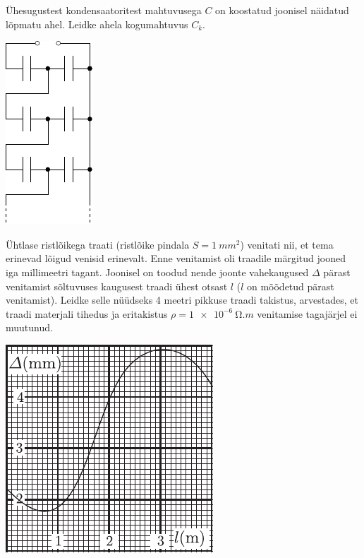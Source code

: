 \documentclass[10pt]{article}
\begin{document}
{%

Ühesugustest kondensaatoritest mahtuvusega $C$ on koostatud joonisel näidatud lõpmatu ahel. Leidke ahela kogumahtuvus $C_k$.

\begin{center}
	\includegraphics[width=0.3\linewidth]{2007-v2g-08-yl}
\end{center}
\probend
\bigskip


Ühtlase ristlõikega traati (ristlõike pindala $S = \SI{1}{mm^2}$) venitati nii, et tema erinevad lõigud venisid erinevalt. Enne venitamist oli traadile märgitud jooned iga millimeetri tagant. Joonisel on toodud nende joonte vahekaugused $\Delta$ pärast venitamist sõltuvuses kaugusest traadi ühest otsast $l$ ($l$ on mõõdetud pärast venitamist). Leidke selle nüüdseks 4 meetri pikkuse traadi takistus, arvestades, et traadi materjali tihedus ja eritakistus $\rho = \SI{1e-6}{\ohm.m}$ venitamise tagajärjel ei muutunud.

\begin{center}
	\includegraphics[width=0.6\linewidth]{2008-v3g-07-yl}
\end{center}
\probend
\bigskip

}
\end{document}
